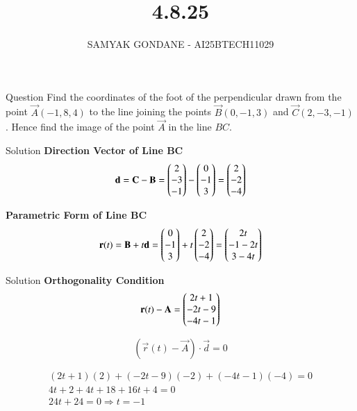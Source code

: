 \documentclass{beamer}
\title 
{4.8.25}
\date{}
\author
{SAMYAK GONDANE - AI25BTECH11029}
\begin{document}
\frame{\titlepage}

\begin{frame}{Question}
Find the coordinates of the foot of the perpendicular drawn from the point $\vec{A}(-1, 8, 4)$ to the line joining the points $\vec{B}(0, -1, 3)$ and $\vec{C}(2, -3, -1)$. Hence find the image of the point $\vec{A}$ in the line $BC$.
\end{frame}

\begin{frame}{Solution}
\textbf{Direction Vector of Line BC}
\begin{align}
\mathbf{d} = \mathbf{C} - \mathbf{B} = 
\begin{pmatrix}2 \\ -3 \\ -1\end{pmatrix} - \begin{pmatrix}0 \\ -1 \\ 3\end{pmatrix} = \begin{pmatrix}2 \\ -2 \\ -4\end{pmatrix}
\end{align}

\textbf{Parametric Form of Line BC}
\begin{align}
\mathbf{r}(t) = \mathbf{B} + t\mathbf{d} = 
\begin{pmatrix}
0 \\ -1 \\ 3
\end{pmatrix}
+ t
\begin{pmatrix}
2 \\ -2 \\ -4
\end{pmatrix}
=
\begin{pmatrix}
2t \\ -1 - 2t \\ 3 - 4t
\end{pmatrix}
\end{align}
\end{frame}

\begin{frame}{Solution}
\textbf{Orthogonality Condition}
\begin{align}
\mathbf{r}(t) - \mathbf{A} =
\begin{pmatrix}2t + 1 \\ -2t - 9 \\ -4t - 1\end{pmatrix}
\end{align}

$$(\vec{r}(t) - \vec{A}) \cdot \vec{d} = 0$$

\begin{align}
(2t + 1)(2) + (-2t - 9)(-2) + (-4t - 1)(-4) = 0 \\
4t + 2 + 4t + 18 + 16t + 4 = 0 \\
24t + 24 = 0 \Rightarrow t = -1
\end{align}
\end{frame}
\end{document}

